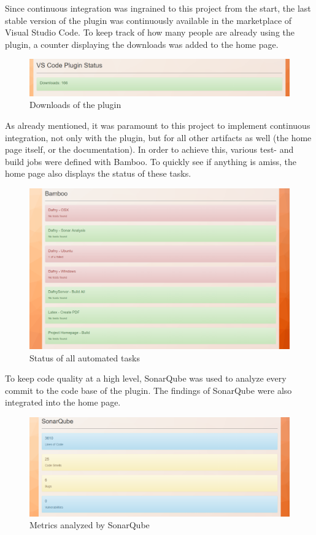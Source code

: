 Since continuous integration was ingrained to this project from the start, the last stable version of the plugin was continuously available in the marketplace of Visual Studio Code. To keep track of how many people are already using the plugin, a counter displaying the downloads was added to the home page. \newline
\begin{figure}[H]
	\centering
	\includegraphics[width=1\textwidth]{img/homeCounter}
	\caption{Downloads of the plugin}
	\label{fig:Plugin Downloads}
\end{figure}

As already mentioned, it was paramount to this project to implement continuous integration, not only with the plugin, but for all other artifacts as well (the home page itself, or the documentation). In order to achieve this, various test- and build jobs were defined with Bamboo. To quickly see if anything is amiss, the home page also displays the status of these tasks. \newline
\begin{figure}[H]
	\centering
	\includegraphics[width=1\textwidth]{img/homeBuilds}
	\caption{Status of all automated tasks}
	\label{fig:Bamboo Tasks}
\end{figure}

To keep code quality at a high level, SonarQube was used to analyze every commit to the code base of the plugin. The findings of SonarQube were also integrated into the home page. \newline
\begin{figure}[H]
	\centering
	\includegraphics[width=1\textwidth]{img/homeSonar}
	\caption{Metrics analyzed by SonarQube}
	\label{fig:SonarQube}
\end{figure}

